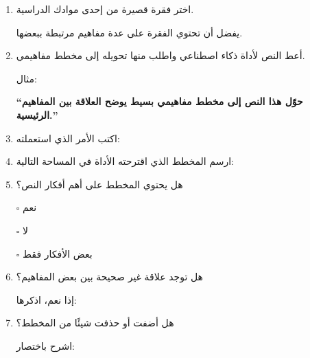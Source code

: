 \documentclass[a4paper]{article}
\begin{document}
\begin{enumerate}


\item اختر فقرة قصيرة من إحدى موادك الدراسية.

يفضل أن تحتوي الفقرة على عدة مفاهيم مرتبطة ببعضها.


\item أعط النص لأداة ذكاء اصطناعي واطلب منها
تحويله إلى مخطط مفاهيمي.

مثال:

\begin{center}

\textbf{
``حوّل هذا النص إلى مخطط مفاهيمي بسيط يوضح
العلاقة بين المفاهيم الرئيسية.''
}

\end{center}


\item اكتب الأمر الذي استعملته:



\item ارسم المخطط الذي اقترحته الأداة في المساحة التالية:

\begin{center}

\fbox{
\parbox[c][5cm][c]{13cm}{
\centering
\textbf{ }
}}

\end{center}


\item هل يحتوي المخطط على أهم أفكار النص؟

\begin{center}

$\square$ نعم

\hspace{2cm}

$\square$ لا

\hspace{2cm}

$\square$ بعض الأفكار فقط

\end{center}


\item هل توجد علاقة غير صحيحة بين بعض المفاهيم؟

إذا نعم، اذكرها:




\item هل أضفت أو حذفت شيئًا من المخطط؟

اشرح باختصار:



\end{enumerate}
\end{document}
